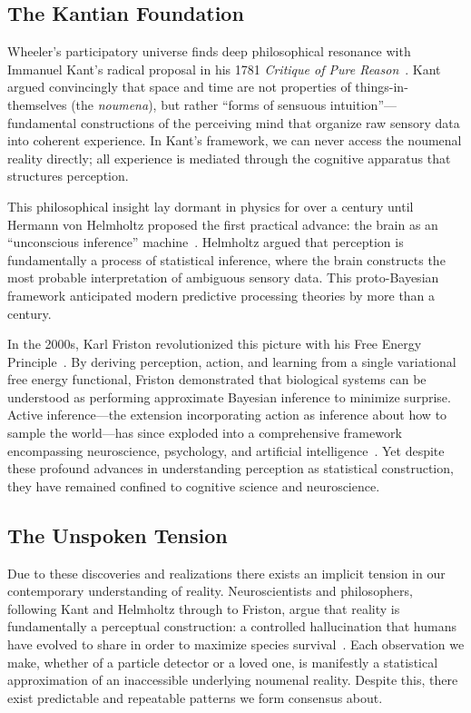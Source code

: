 \documentclass[11pt]{article}
\begin{document}
\subsection{The Kantian Foundation}
\label{sec:philosophy}

Wheeler's participatory universe finds deep philosophical resonance with Immanuel Kant's radical proposal in his 1781 \emph{Critique of Pure Reason}~\cite{Kant1781}. Kant argued convincingly that space and time are not properties of things-in-themselves (the \emph{noumena}), but rather ``forms of sensuous intuition''---fundamental constructions of the perceiving mind that organize raw sensory data into coherent experience. In Kant's framework, we can never access the noumenal reality directly; all experience is mediated through the cognitive apparatus that structures perception.

This philosophical insight lay dormant in physics for over a century until Hermann von Helmholtz proposed the first practical advance: the brain as an ``unconscious inference'' machine~\cite{Helmholtz1867}. Helmholtz argued that perception is fundamentally a process of statistical inference, where the brain constructs the most probable interpretation of ambiguous sensory data. This proto-Bayesian framework anticipated modern predictive processing theories by more than a century.

In the 2000s, Karl Friston revolutionized this picture with his Free Energy Principle~\cite{Friston2010}. By deriving perception, action, and learning from a single variational free energy functional, Friston demonstrated that biological systems can be understood as performing approximate Bayesian inference to minimize surprise. Active inference---the extension incorporating action as inference about how to sample the world---has since exploded into a comprehensive framework encompassing neuroscience, psychology, and artificial intelligence~\cite{Parr2022}. Yet despite these profound advances in understanding perception as statistical construction, they have remained confined to cognitive science and neuroscience.

\subsection{The Unspoken Tension}

Due to these discoveries and realizations there exists an implicit tension in our contemporary understanding of reality. Neuroscientists and philosophers, following Kant and Helmholtz through to Friston, argue that reality is fundamentally a perceptual construction: a controlled hallucination that humans have evolved to share in order to maximize species survival~\cite{Clark2016,Hoffman2019}. Each observation we make, whether of a particle detector or a loved one, is manifestly a statistical approximation of an inaccessible underlying noumenal reality. Despite this, there exist predictable and repeatable patterns we form consensus about.
\end{document}
